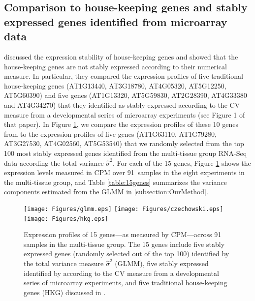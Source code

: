 \documentclass[letterpaper,12pt]{article}
\newcommand{\howmanytissuesample}{91~}
\newcommand{\SelectFiveGene}{AT1G63110, AT1G79280, AT3G27530, AT4G02560, AT5G53540}
\begin{document}


\subsection{Comparison to house-keeping genes and stably expressed genes
identified from microarray data}\label{section:CompareStablyExpressedGene}
\cite{czechowski2005genome} discussed the expression stability of
house-keeping genes and showed that the house-keeping genes are not stably
expressed according to their numerical measure. In particular, they compared
the expression profiles of five traditional house-keeping genes (AT1G13440,
AT3G18780, AT4G05320, AT5G12250, AT5G60390) and five genes (AT1G13320,
AT5G59830, AT2G28390, AT4G33380 and AT4G34270) that they identified  as stably
expressed according to the CV measure from a developmental series of
microarray experiments (see Figure 1 of that paper).  
In Figure \ref{expressionlevel1}, we compare the expression profiles 
of these 10 genes from \cite{czechowski2005genome} to the expression profiles
of five genes (\SelectFiveGene) that we
randomly selected from the top 100 most stably expressed genes identified from
the multi-tissue group RNA-Seq data according the total variance $\hat\sigma^2$.
For each of the 15 genes, Figure \ref{expressionlevel1} shows the expression levels measured
in CPM over \howmanytissuesample samples in the eight experiments in the multi-tissue group,
and Table \ref{table:15genes} summarizes the variance components estimated from the
GLMM in \ref{subsection:OurMethod}. 

\begin{figure}[htbp]
    \begin{center}
	\texttt{[image: Figures/glmm.eps]}
	\texttt{[image: Figures/czechowski.eps]}
	\texttt{[image: Figures/hkg.eps]}
	\caption{Expression profiles of 15 genes---as measured by CPM---across \howmanytissuesample
	samples in the multi-tissue group. The 15 genes include 
	five stably expressed genes (randomly selected out of the top 100)
	identified by the total variance measure $\hat{\sigma}^2$ (GLMM), five stably
	expressed identified by \citet{czechowski2005genome} according to the CV measure from a
	developmental series of microarray experiments, and five
	traditional house-keeping genes (HKG) discussed in
	\citet{czechowski2005genome}. 
	}
	\label{expressionlevel1}
    \end{center}
\end{figure} 
\end{document}

